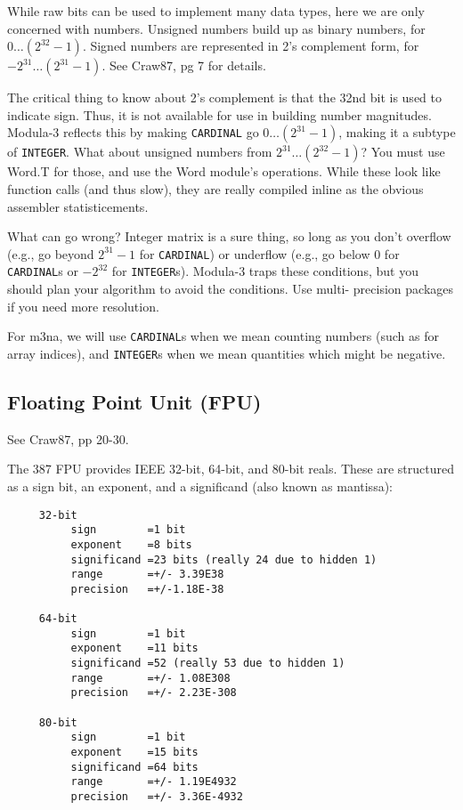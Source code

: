 While raw bits can be used to implement many data types,
here we are only concerned with numbers.  Unsigned numbers
build up as binary numbers, for $0 \dots (2^{32} - 1)$.  Signed numbers
are represented in 2's complement form, for $-2^{31} \dots (2^{31} -
1)$.  See Craw87, pg 7 for details.

The critical thing to know about 2's complement is that the
32nd bit is used to indicate sign.  Thus, it is not
available for use in building number magnitudes.  Modula-3
reflects this by making {\tt CARDINAL}  go $0 \dots (2^{31} -1)$, 
making it a subtype of {\tt INTEGER}.  What about unsigned numbers from
$2^{31} \dots (2^{32}-1)$?  You must use Word.T for those, and use the
Word module's operations.  While these look like function
calls (and thus slow), they are really compiled inline as
the obvious assembler statisticements.

What can go wrong?  Integer matrix is a sure thing, so long as
you don't overflow (e.g., go beyond $2^{31}-1$ for {\tt CARDINAL}) or
underflow (e.g., go below $0$ for {\tt CARDINAL}s or $-2^{32}$ for
{\tt INTEGER}s).  Modula-3 traps these conditions, but you should
plan your algorithm to avoid the conditions.  Use multi-
precision packages if you need more resolution.

For m3na, we will use {\tt CARDINAL}s when we mean counting
numbers (such as for array indices), and {\tt INTEGER}s when we
mean quantities which might be negative.

\subsection{Floating Point Unit (FPU)}
See Craw87, pp 20-30.

The 387 FPU provides IEEE 32-bit, 64-bit, and 80-bit reals.
These are structured as a sign bit, an exponent, and a
significand (also known as mantissa):
\begin{verbatim}
     32-bit
          sign        =1 bit
          exponent    =8 bits
          significand =23 bits (really 24 due to hidden 1)
          range       =+/- 3.39E38
          precision   =+/-1.18E-38
     
     64-bit
          sign        =1 bit
          exponent    =11 bits
          significand =52 (really 53 due to hidden 1)
          range       =+/- 1.08E308
          precision   =+/- 2.23E-308
     
     80-bit
          sign        =1 bit
          exponent    =15 bits
          significand =64 bits
          range       =+/- 1.19E4932
          precision   =+/- 3.36E-4932
\end{verbatim}

